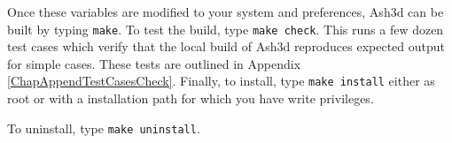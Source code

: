 Once these variables are modified to your system and preferences, Ash3d can
be built by typing \texttt{make}.
To test the build, type \texttt{make check}. This runs a few dozen test cases which verify
that the local build of Ash3d reproduces expected output for simple cases. These
tests are outlined in Appendix \ref{ChapAppendTestCasesCheck}.
Finally, to install, type \texttt{make install}
either as root or with a installation path for which you have write
privileges.

To uninstall, type \texttt{make uninstall}.
